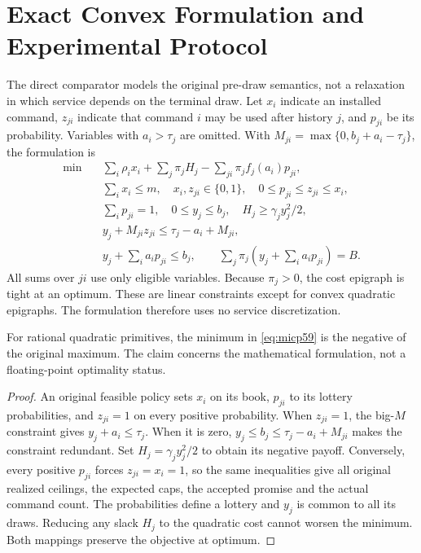 \section{Exact Convex Formulation and Experimental Protocol}\label{sec:form59}
The direct comparator models the original pre-draw semantics, not a relaxation in which service depends on the terminal draw. Let $x_i$ indicate an installed command, $z_{ji}$ indicate that command $i$ may be used after history $j$, and $p_{ji}$ be its probability. Variables with $a_i>\tau_j$ are omitted. With $M_{ji}=\max\{0,b_j+a_i-\tau_j\}$, the formulation is
\begin{align}
 \min\quad &\sum_i\rho_i x_i+\sum_j\pi_jH_j-\sum_{ji}\pi_j f_j(a_i)p_{ji},\label{eq:micp59}\\
 &\sum_i x_i\leq m,\quad x_i,z_{ji}\in\{0,1\},\quad 0\leq p_{ji}\leq z_{ji}\leq x_i,\\
 &\sum_i p_{ji}=1,\quad 0\leq y_j\leq b_j,\quad H_j\geq\gamma_j y_j^2/2,\\
 &y_j+M_{ji}z_{ji}\leq\tau_j-a_i+M_{ji},\\
 &y_j+\sum_i a_i p_{ji}\leq b_j,\qquad
 \sum_j\pi_j\left(y_j+\sum_i a_i p_{ji}\right)=B.\nonumber
\end{align}
All sums over $ji$ use only eligible variables. Because $\pi_j>0$, the cost epigraph is tight at an optimum. These are linear constraints except for convex quadratic epigraphs. The formulation therefore uses no service discretization.

\begin{proposition}\label{prop:micp59}
For rational quadratic primitives, the minimum in \eqref{eq:micp59} is the negative of the original maximum. The claim concerns the mathematical formulation, not a floating-point optimality status.
\end{proposition}
\begin{proof}
An original feasible policy sets $x_i$ on its book, $p_{ji}$ to its lottery probabilities, and $z_{ji}=1$ on every positive probability. When $z_{ji}=1$, the big-$M$ constraint gives $y_j+a_i\leq\tau_j$. When it is zero, $y_j\leq b_j\leq\tau_j-a_i+M_{ji}$ makes the constraint redundant. Set $H_j=\gamma_jy_j^2/2$ to obtain its negative payoff. Conversely, every positive $p_{ji}$ forces $z_{ji}=x_i=1$, so the same inequalities give all original realized ceilings, the expected caps, the accepted promise and the actual command count. The probabilities define a lottery and $y_j$ is common to all its draws. Reducing any slack $H_j$ to the quadratic cost cannot worsen the minimum. Both mappings preserve the objective at optimum.
\end{proof}

